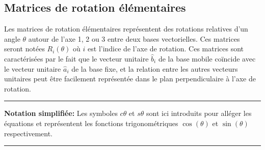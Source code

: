 \subsection{Matrices de rotation élémentaires}

Les matrices de rotation élémentaires représentent des rotations relatives d'un angle $\theta$ autour de l'axe 1, 2 ou 3 entre deux bases vectorielles. Ces matrices seront notées $R_i(\theta)$ où $i$ est l'indice de l'axe de rotation. Ces matrices sont caractérisées par le fait que le vecteur unitaire $\hat{b}_i$ de la base mobile coïncide avec le vecteur unitaire $\hat{a}_i$ de la base fixe, et la relation entre les autres vecteurs unitaires peut être facilement représentée dans le plan perpendiculaire à l'axe de rotation. 


\newline
\noindent
\rule{\linewidth}{0.3mm}
\textbf{Notation simplifiée:} Les symboles $c\theta$ et $s\theta$ sont ici introduits pour alléger les équations et représentent les fonctions trigonométriques $\cos(\theta)$ et $\sin(\theta)$ respectivement.
\\
\rule{\linewidth}{0.3mm}


